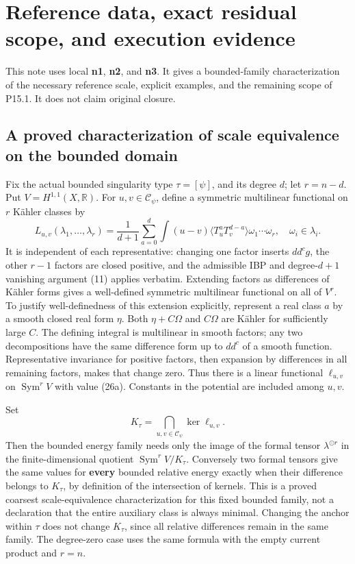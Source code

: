 \documentclass[
  11pt,
]{article}
\begin{document}
\section{Reference data, exact residual scope, and execution
evidence}\label{reference-data-exact-residual-scope-and-execution-evidence}

This note uses local \textbf{n1}, \textbf{n2}, and \textbf{n3}. It gives
a bounded-family characterization of the necessary reference scale,
explicit examples, and the remaining scope of P15.1. It does not claim
original closure.

\subsection{A proved characterization of scale equivalence on the
bounded
domain}\label{a-proved-characterization-of-scale-equivalence-on-the-bounded-domain}

Fix the actual bounded singularity type \(\tau=[\psi]\), and its degree
\(d\); let \(r=n-d\). Put \(V=H^{1,1}(X,\mathbb R)\). For
\(u,v\in\mathcal C_\psi\), define a symmetric multilinear functional on
\(r\) Kähler classes by \[
L_{u,v}(\lambda_1,\ldots,\lambda_r)
=\frac1{d+1}\sum_{a=0}^d\int(u-v)
\langle T_u^aT_v^{d-a}\rangle\omega_1\cdots\omega_r,
\quad\omega_i\in\lambda_i.
\tag{26a}
\] It is independent of each representative: changing one factor inserts
\(dd^cg\), the other \(r-1\) factors are closed positive, and the
admissible IBP and degree-\(d+1\) vanishing argument (11) applies
verbatim. Extending factors as differences of Kähler forms gives a
well-defined symmetric multilinear functional on all of \(V^r\). To
justify well-definedness of this extension explicitly, represent a real
class \(a\) by a smooth closed real form \(\eta\). Both \(\eta+C\Omega\)
and \(C\Omega\) are Kähler for sufficiently large \(C\). The defining
integral is multilinear in smooth factors; any two decompositions have
the same difference form up to \(dd^c\) of a smooth function.
Representative invariance for positive factors, then expansion by
differences in all remaining factors, makes that change zero. Thus there
is a linear functional \(\ell_{u,v}\) on \(\operatorname{Sym}^rV\) with
value (26a). Constants in the potential are included among \(u,v\).

Set \[
K_\tau=\bigcap_{u,v\in\mathcal C_\psi}\ker\ell_{u,v}.
\tag{27a}
\] Then the bounded energy family needs only the image of the formal
tensor \(\lambda^{\odot r}\) in the finite-dimensional quotient
\(\operatorname{Sym}^rV/K_\tau\). Conversely two formal tensors give the
same values for \textbf{every} bounded relative energy exactly when
their difference belongs to \(K_\tau\), by definition of the
intersection of kernels. This is a proved coarsest scale-equivalence
characterization for this fixed bounded family, not a declaration that
the entire auxiliary class is always minimal. Changing the anchor within
\(\tau\) does not change \(K_\tau\), since all relative differences
remain in the same family. The degree-zero case uses the same formula
with the empty current product and \(r=n\).
\end{document}
